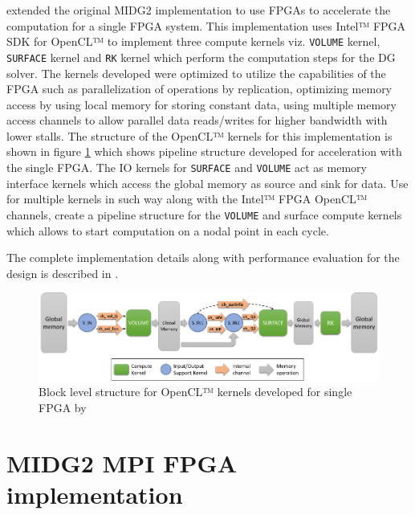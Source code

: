 \textcite{kenter_opencl-based_2018} extended the original MIDG2 implementation to use
FPGAs to accelerate the computation for a single FPGA system. This implementation
uses Intel™ FPGA SDK for OpenCL™ to implement three compute kernels viz. \texttt{VOLUME} kernel,
\texttt{SURFACE} kernel and \texttt{RK} kernel which perform the computation steps for the \ac{DG} solver.
The kernels developed were optimized to utilize the capabilities of the FPGA such
as parallelization of operations by replication, optimizing memory access by using
local memory for storing constant data, using multiple memory access channels to allow parallel data
reads/writes for higher bandwidth with lower stalls.
The structure of the OpenCL™ kernels for this implementation is shown in figure  \ref{fig:singlefpga_kernstruc}
which shows pipeline structure developed for acceleration with the single FPGA.
The IO kernels for \texttt{SURFACE} and \texttt{VOLUME} act as memory interface kernels which
access the global memory as source and sink for data. Use for multiple
kernels in such way along with the Intel™ FPGA OpenCL™
channels, create a pipeline structure for the \texttt{VOLUME} and surface compute kernels
which allows to start computation on a nodal point in each cycle.

The complete implementation details along with performance evaluation for the design
is described in \cite{kenter_opencl-based_2018}.

\begin{figure}[ht]%
    \centering
    \includegraphics[width=1.0\textwidth]{images/nb_kernstruc}
    \caption{Block level structure for OpenCL™ kernels developed for single FPGA by \textcite{kenter_opencl-based_2018}}
    \label{fig:singlefpga_kernstruc}
\end{figure}


\section{MIDG2 MPI FPGA implementation}
\label{sec:fpga_dg}

